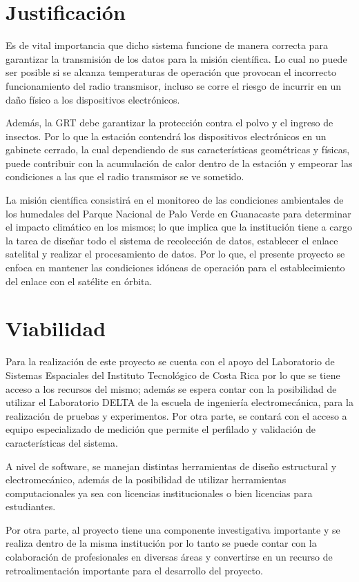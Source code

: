 \section{Justificación}
Es de vital importancia que dicho sistema funcione de manera correcta para garantizar la transmisión de los datos para la misión científica. Lo cual no puede ser posible si se alcanza temperaturas de operación que provocan el incorrecto funcionamiento del radio transmisor, incluso se corre el riesgo de incurrir en un daño físico a los dispositivos electrónicos.

Además, la GRT debe garantizar la protección contra el polvo y el ingreso de insectos. Por lo que la estación  contendrá los dispositivos electrónicos en un gabinete cerrado, la cual dependiendo de sus características geométricas y físicas, puede contribuir con la acumulación de calor dentro de la estación y empeorar las condiciones a las que el radio transmisor se ve sometido.

La misión científica consistirá en el monitoreo de las condiciones ambientales de los humedales del Parque Nacional de Palo Verde en Guanacaste para determinar el impacto climático en los mismos; lo que implica que la institución tiene a cargo la tarea de diseñar todo el sistema de recolección de datos, establecer el enlace satelital y realizar el procesamiento de datos. \cite{1} Por lo que, el presente proyecto se enfoca en mantener las condiciones idóneas de operación para el establecimiento del enlace con el satélite en órbita.

\section{Viabilidad}
Para la realización de este proyecto se cuenta con el apoyo del Laboratorio de Sistemas Espaciales del Instituto Tecnológico de Costa Rica por lo que se tiene acceso a los recursos del mismo; además se espera contar con la posibilidad de utilizar el Laboratorio DELTA de la escuela de ingeniería electromecánica, para la realización de pruebas y experimentos. Por otra parte, se contará con el acceso a equipo especializado de medición que permite el perfilado y validación de características del sistema.

A nivel de software, se manejan distintas herramientas de diseño estructural y electromecánico, además de la posibilidad de utilizar herramientas computacionales ya sea con licencias institucionales o bien licencias para estudiantes.

Por otra parte, al proyecto tiene una componente investigativa importante y se realiza dentro de la misma institución por lo tanto se puede contar con la colaboración de profesionales en diversas áreas y convertirse en un recurso de retroalimentación importante para el desarrollo del proyecto.

